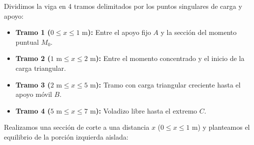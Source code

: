 Dividimos la viga en 4 tramos delimitados por los puntos singulares de carga y apoyo:
\begin{itemize}
    \item \textbf{Tramo 1 ($0 \le x \le 1\text{ m}$):} Entre el apoyo fijo $A$ y la sección del momento puntual $M_0$.
    \item \textbf{Tramo 2 ($1\text{ m} \le x \le 2\text{ m}$):} Entre el momento concentrado y el inicio de la carga triangular.
    \item \textbf{Tramo 3 ($2\text{ m} \le x \le 5\text{ m}$):} Tramo con carga triangular creciente hasta el apoyo móvil $B$.
    \item \textbf{Tramo 4 ($5\text{ m} \le x \le 7\text{ m}$):} Voladizo libre hasta el extremo $C$.
\end{itemize}


Realizamos una sección de corte a una distancia $x$ ($0 \le x \le 1\text{ m}$) y planteamos el equilibrio de la porción izquierda aislada:

